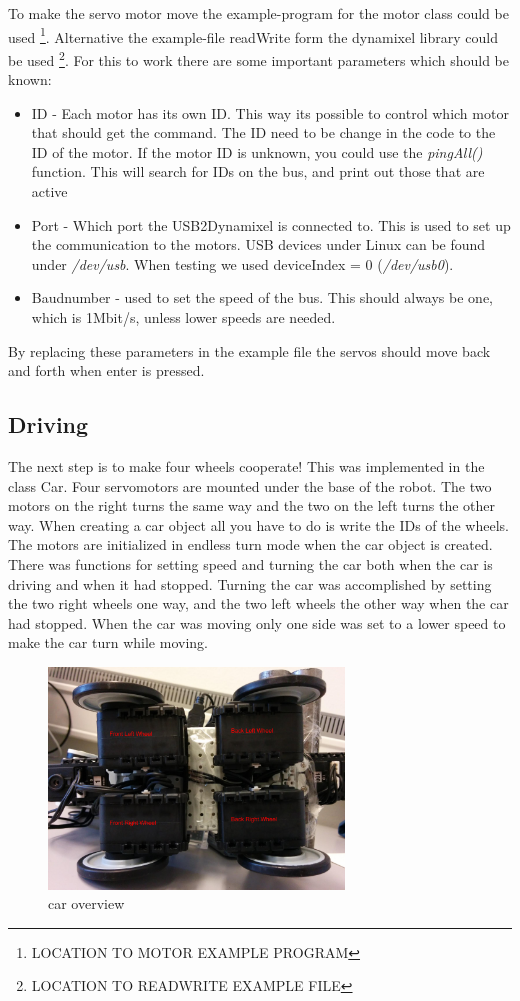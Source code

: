 To make the servo motor move the example-program for the motor class could be used \footnote{LOCATION TO MOTOR EXAMPLE PROGRAM}. Alternative the example-file readWrite form the dynamixel library could be used \footnote{LOCATION TO READWRITE EXAMPLE FILE}. 
For this to work there are some important parameters which should be known:
\begin{itemize}
     \item ID - Each motor has its own ID. This way its possible to control which motor that should get the command. The ID need to be change in the code to the ID of the motor. If the motor ID is unknown, you could use the \textit{pingAll()} function. This will search for IDs on the bus, and print out those that are active
     \item Port - Which port the USB2Dynamixel is connected to. This is used to set up the communication to the motors. USB devices under Linux can be found under \textit{/dev/usb}. When testing we used deviceIndex = 0 (\textit{/dev/usb0}).
     \item Baudnumber - used to set the speed of the bus. This should always be one, which is 1Mbit/s, unless lower speeds are needed.
\end{itemize}
\bigskip

By replacing these parameters in the example file the servos should move back and forth when enter is pressed.


\subsection{Driving}
The next step is to make four wheels cooperate!
This was implemented in the class Car. Four servomotors are mounted under the base of the robot. The two motors on the right turns the same way and the two on the left turns the other way. When creating a car object all you have to do is write the IDs of the wheels. The motors are initialized in endless turn mode when the car object is created. There was functions for setting speed and turning the car both when the car is driving and when it had stopped. Turning the car was accomplished by setting the two right wheels one way, and the two left wheels the other way when the car had stopped. When the car was moving only one side was set to a lower speed to make the car turn while moving.


\begin{figure}[H]
    \centering
    \includegraphics[width=0.7\textwidth]{graphics/Car.png}
    \caption{car overview}
    \label{fig:car} 
\end{figure}



